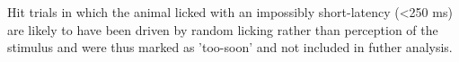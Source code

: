 Hit trials in which the animal licked with an impossibly short-latency (<250 ms) are likely to have been driven by random licking rather than perception of the stimulus and were thus marked as 'too-soon' and not included in futher analysis.















